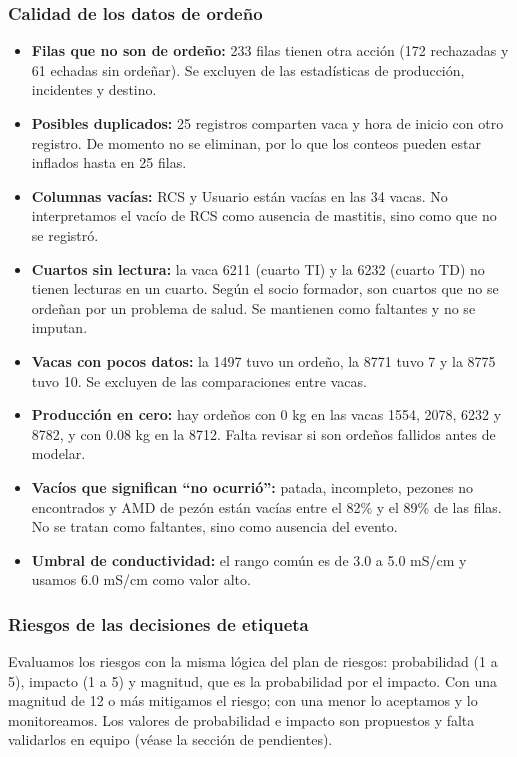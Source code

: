 \subsubsection*{Calidad de los datos de ordeño}

\begin{itemize}
  \item \textbf{Filas que no son de ordeño:} 233 filas tienen otra acción (172 rechazadas y 61 echadas sin ordeñar). Se excluyen de las estadísticas de producción, incidentes y destino.
  \item \textbf{Posibles duplicados:} 25 registros comparten vaca y hora de inicio con otro registro. De momento no se eliminan, por lo que los conteos pueden estar inflados hasta en 25 filas.
  \item \textbf{Columnas vacías:} RCS y Usuario están vacías en las 34 vacas. No interpretamos el vacío de RCS como ausencia de mastitis, sino como que no se registró.
  \item \textbf{Cuartos sin lectura:} la vaca 6211 (cuarto TI) y la 6232 (cuarto TD) no tienen lecturas en un cuarto. Según el socio formador, son cuartos que no se ordeñan por un problema de salud. Se mantienen como faltantes y no se imputan.
  \item \textbf{Vacas con pocos datos:} la 1497 tuvo un ordeño, la 8771 tuvo 7 y la 8775 tuvo 10. Se excluyen de las comparaciones entre vacas.
  \item \textbf{Producción en cero:} hay ordeños con 0 kg en las vacas 1554, 2078, 6232 y 8782, y con 0.08 kg en la 8712. Falta revisar si son ordeños fallidos antes de modelar.
  \item \textbf{Vacíos que significan ``no ocurrió'':} patada, incompleto, pezones no encontrados y AMD de pezón están vacías entre el 82\% y el 89\% de las filas. No se tratan como faltantes, sino como ausencia del evento.
  \item \textbf{Umbral de conductividad:} el rango común es de 3.0 a 5.0 mS/cm y usamos 6.0 mS/cm como valor alto.
\end{itemize}

\subsubsection*{Riesgos de las decisiones de etiqueta}

Evaluamos los riesgos con la misma lógica del plan de riesgos: probabilidad (1 a 5), impacto (1 a 5) y magnitud, que es la probabilidad por el impacto. Con una magnitud de 12 o más mitigamos el riesgo; con una menor lo aceptamos y lo monitoreamos. Los valores de probabilidad e impacto son propuestos y falta validarlos en equipo (véase la sección de pendientes).

